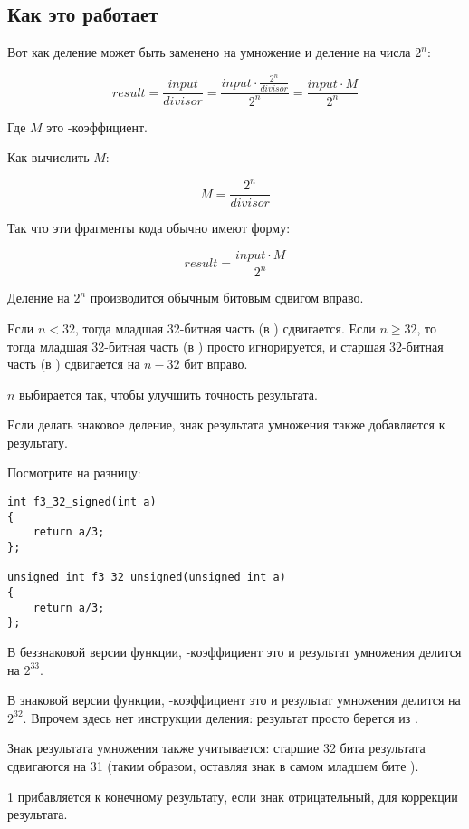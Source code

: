 ﻿\subsection{Как это работает}

Вот как деление может быть заменено на умножение и деление на числа $2^{n}$:

\[
	result = 
	\frac{input}{divisor} = 
	\frac{input \cdot \frac{2^{n}}{divisor}}{2^{n}} = 
	\frac{input \cdot M}{2^{n}}
\]

Где $M$ это -коэффициент.

Как вычислить $M$:

\[
	M = \frac{2^{n}}{divisor}
\]

Так что эти фрагменты кода обычно имеют форму:

\[
	result = \frac{input \cdot M}{2^{n}}
\]

Деление на $2^{n}$ производится обычным битовым сдвигом вправо.

Если $n<32$, тогда младшая 32-битная часть  (в \EAX) сдвигается.
Если $n\geq{}32$, то тогда младшая 32-битная часть  
(в \EAX) просто игнорируется, и старшая 32-битная часть (в \EDX) сдвигается на $n-32$ бит вправо.

$n$ выбирается так, чтобы улучшить точность результата.

Если делать знаковое деление, знак результата умножения также добавляется к результату.

Посмотрите на разницу:

\begin{lstlisting}
int f3_32_signed(int a)
{
	return a/3;
};

unsigned int f3_32_unsigned(unsigned int a)
{
	return a/3;
};
\end{lstlisting}

В беззнаковой версии функции, -коэффициент это  и результат умножения делится на $2^{33}$.

В знаковой версии функции, -коэффициент это
  и результат умножения делится на $2^{32}$.
Впрочем здесь нет инструкции деления: результат просто берется из \EDX. 

Знак результата умножения также учитывается: старшие 32 бита результата сдвигаются на 31
(таким образом, оставляя знак в самом младшем бите \EAX).

1 прибавляется к конечному результату, если знак отрицательный, для коррекции результата.

